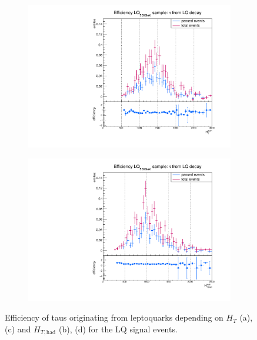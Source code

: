 \begin{figure}
\begin{subfigure}[t]{0.49\textwidth}
                \label{DividedFromLQ:signal:HThadLQ75}
                \end{subfigure}
                \begin{subfigure}[t]{0.49\textwidth}
                \includegraphics[width=\textwidth]{figures/plots/LQ76/Divided_fromLQHT.pdf}
                \label{DividedFromLQ:signal:HTLQ76}
                \end{subfigure}
                \begin{subfigure}[t]{0.49\textwidth}
                \includegraphics[width=\textwidth]{figures/plots/LQ76/Divided_fromLQHThad.pdf}
                \label{DividedFromLQ:signal:HThadLQ76}
                \end{subfigure}
\caption[Efficiency of taus originating from leptoquarks for the LQ signal events.]{Efficiency of taus originating from leptoquarks depending on $H_{T}$ (a), (c) and $H_{T,\text{had}}$ (b), (d) for the LQ signal events.}
\label{DividedFromLQ:signal:HTgedöns}
\end{figure}
